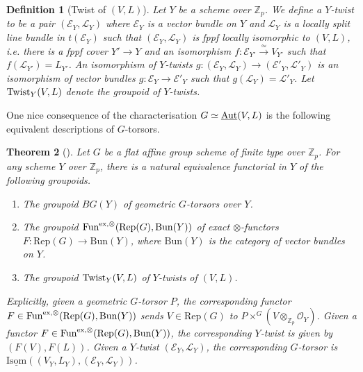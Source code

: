 \documentclass[10pt]{article}
\newtheorem{thm}{Theorem}[section]
\newtheorem{dfn}[thm]{Definition}
\numberwithin{equation}{section}
\newcommand{\bZ}{{\mathbb Z}}
\newcommand{\calE}{{\mathcal E}}
\newcommand{\calL}{{\mathcal L}}
\newcommand{\calO}{{\mathcal O}}
\newcommand{\Bun}{{\mathrm{Bun}}}           %
\newcommand{\Isom}{{\mathrm{Isom}}}         %
\newcommand{\Rep}{{\mathrm{Rep}}}           %
\newcommand{\Fun}{\mathrm{Fun}}
\begin{document}
\begin{dfn}[Twist of $(V,L)$]\label{Y-twist}
    Let $Y$ be a scheme over $\bZ_p$. We define a $Y$-twist to be a pair $(\calE_Y,\calL_Y)$ where $\calE_Y$ is a vector bundle on $Y$ and $\calL_Y$ is a locally split line bundle in $t(\calE_Y)$ such that $(\calE_Y,\calL_Y)$ is fppf locally isomorphic to $(V,L)$, i.e. there is a fppf cover $Y'\to Y$ and an isomorphism $f: \calE_{Y'}\xrightarrow{\simeq}V_{Y'}$ such that $f(\calL_{Y'})=L_{Y'}$. An isomorphism of $Y$-twists $g:(\calE_Y,\calL_Y)\to (\calE'_Y,\calL'_Y)$ is an isomorphism of vector bundles $g:\calE_Y\to \calE'_Y$ such that $g(\calL_Y)=\calL'_Y$. Let ${\rm Twist}_Y(V,L)$ denote the groupoid of $Y$-twists.
\end{dfn}


One nice consequence of the characterisation $G\simeq \underline{\mathrm{Aut}}(V,L)$ is the following equivalent descriptions of $G$-torsors.

\begin{thm}[{\cite[Theorem 1.2, Corollary 1.3]{Bro13}}]\label{G-description}
    Let $G$ be a flat affine group scheme of finite type over $\bZ_p$. For any scheme $Y$ over $\bZ_p$, there is a natural equivalence functorial in $Y$ of the following groupoids.
    \begin{enumerate}
        \item The groupoid $BG(Y)$ of geometric $G$-torsors over $Y$.
        \item The groupoid $\Fun^{{\rm ex},\otimes}(\Rep(G),\Bun(Y))$ of exact $\otimes$-functors $F:\Rep(G)\to \Bun(Y)$, where $\Bun(Y)$ is the category of vector bundles on $Y$.
        \item The groupoid ${\rm Twist}_Y(V,L)$ of $Y$-twists of $(V,L)$.
    \end{enumerate}

    Explicitly, given a geometric $G$-torsor $P$, the corresponding functor $F\in \Fun^{{\rm ex},\otimes}(\Rep(G),\Bun(Y))$ sends $V\in \Rep(G)$ to $P\times^G (V\otimes_{\bZ_p}\calO_Y)$. Given a functor $F\in \Fun^{{\rm ex},\otimes}(\Rep(G),\Bun(Y))$, the corresponding $Y$-twist is given by $(F(V),F(L))$. Given a $Y$-twist $(\calE_Y,\calL_Y)$, the corresponding $G$-torsor is $\underline\Isom((V_Y,L_Y),(\calE_Y,\calL_Y))$.
\end{thm}
\end{document}
